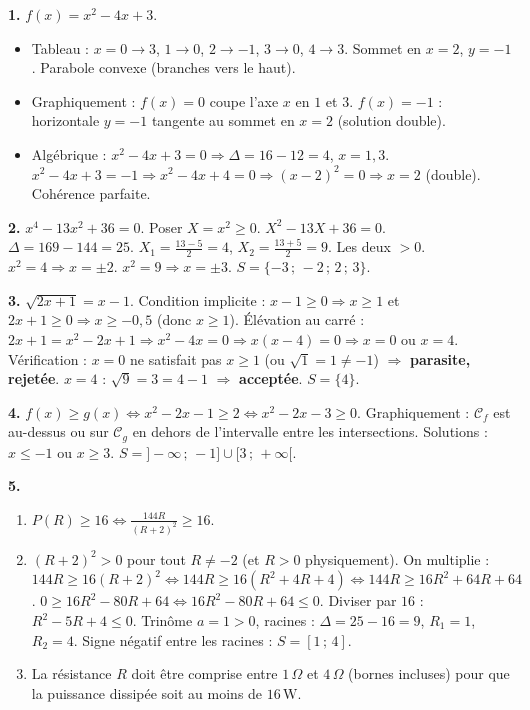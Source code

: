 \documentclass[11pt]{article}
\begin{document}
\begin{corrige}
\textbf{1.} $f(x)=x^2-4x+3$.
\begin{itemize}
\item[a)] Tableau : $x=0\to3$, $1\to0$, $2\to-1$, $3\to0$, $4\to3$. Sommet en $x=2$, $y=-1$. Parabole convexe (branches vers le haut).
\item[b)] Graphiquement : $f(x)=0$ coupe l'axe $x$ en $1$ et $3$. $f(x)=-1$ : horizontale $y=-1$ tangente au sommet en $x=2$ (solution double).
\item[c)] Algébrique : $x^2-4x+3=0 \Rightarrow \Delta=16-12=4$, $x=1, 3$. $x^2-4x+3=-1 \Rightarrow x^2-4x+4=0 \Rightarrow (x-2)^2=0 \Rightarrow x=2$ (double). Cohérence parfaite.
\end{itemize}

\textbf{2.} $x^4-13x^2+36=0$. Poser $X=x^2\geq 0$. $X^2-13X+36=0$. $\Delta=169-144=25$. $X_1=\frac{13-5}{2}=4$, $X_2=\frac{13+5}{2}=9$. Les deux $>0$.
$x^2=4 \Rightarrow x=\pm 2$. $x^2=9 \Rightarrow x=\pm 3$. $S=\{-3\,;\,-2\,;\,2\,;\,3\}$.

\textbf{3.} $\sqrt{2x+1}=x-1$. Condition implicite : $x-1\geq 0 \Rightarrow x\geq 1$ et $2x+1\geq 0 \Rightarrow x\geq -0,5$ (donc $x\geq 1$).
Élévation au carré : $2x+1=x^2-2x+1 \Rightarrow x^2-4x=0 \Rightarrow x(x-4)=0 \Rightarrow x=0$ ou $x=4$.
Vérification : $x=0$ ne satisfait pas $x\geq 1$ (ou $\sqrt{1}=1 \neq -1$) $\Rightarrow$ \textbf{parasite, rejetée}. $x=4$ : $\sqrt{9}=3=4-1$ $\Rightarrow$ \textbf{acceptée}. $S=\{4\}$.

\textbf{4.} $f(x) \geq g(x) \iff x^2-2x-1 \geq 2 \iff x^2-2x-3 \geq 0$.
Graphiquement : $\mathcal{C}_f$ est au-dessus ou sur $\mathcal{C}_g$ en dehors de l'intervalle entre les intersections.
Solutions : $x\leq -1$ ou $x\geq 3$. $S=]-\infty\,;\,-1] \cup [3\,;\,+\infty[$.

\textbf{5.} 
\begin{enumerate}
\item $P(R) \geq 16 \iff \frac{144R}{(R+2)^2} \geq 16$.
\item $(R+2)^2>0$ pour tout $R\neq -2$ (et $R>0$ physiquement). On multiplie :
$144R \geq 16(R+2)^2 \iff 144R \geq 16(R^2+4R+4) \iff 144R \geq 16R^2+64R+64$.
$0 \geq 16R^2 -80R +64 \iff 16R^2 -80R +64 \leq 0$.
Diviser par $16$ : $R^2 -5R +4 \leq 0$.
Trinôme $a=1>0$, racines : $\Delta=25-16=9$, $R_1=1$, $R_2=4$.
Signe négatif entre les racines : $S=[1\,;\,4]$.
\item La résistance $R$ doit être comprise entre $1\,\Omega$ et $4\,\Omega$ (bornes incluses) pour que la puissance dissipée soit au moins de $16\,\text{W}$.
\end{enumerate}
\end{corrige}
\end{document}
